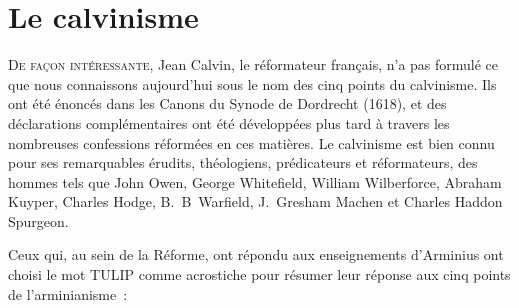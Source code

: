 \chapter{Le calvinisme}

\begin{pocketpar}{}
\lettrine{D}{e façon intéressante,} Jean Calvin, le réformateur français, n'a pas formulé
 ce que nous connaissons aujourd'hui sous le nom des cinq points du calvinisme.
 Ils ont été énoncés dans les Canons du Synode de Dordrecht (1618), et des déclarations
 complémentaires ont été développées plus tard à travers les nombreuses
 confessions réformées en ces matières. Le calvinisme est bien connu
 pour 
 ses remarquables érudits, théologiens, prédicateurs et réformateurs,
 des hommes tels que John Owen, George Whitefield,
 William Wilberforce, Abraham Kuyper, Charles Hodge,
 B.~B~Warfield, J.~Gresham Machen et
 Charles Haddon Spurgeon.
\end{pocketpar}

Ceux qui, au sein de la Réforme, ont répondu aux enseignements d'Arminius
 ont choisi le mot \og TULIP \fg{} comme acrostiche pour résumer
 leur réponse aux cinq points de l'arminianisme~:

